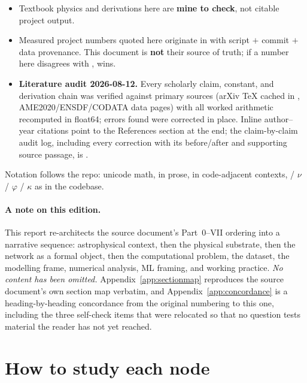 \begin{itemize}
\item Textbook physics and derivations here are \textbf{mine to check}, not
      citable project output.

\item Measured project numbers quoted here originate in  with
      script $+$ commit $+$ data provenance. This document is \textbf{not}
      their source of truth; if a number here disagrees with ,
       wins.

\item \textbf{Literature audit 2026-08-12.} Every scholarly claim, constant,
      and derivation chain was verified against primary sources (arXiv \TeX{}
      cached in , AME2020/ENSDF/CODATA data pages) with
      all worked arithmetic recomputed in float64; errors found were corrected
      in place. Inline author--year citations point to the References section
      at the end; the claim-by-claim audit log, including every correction with
      its before/after and supporting source passage, is
      .
\end{itemize}

Notation follows the repo: unicode math,  in prose,  in
code-adjacent contexts, \Ye{} / $\nu$ / $\varphi$ / $\kappa$ as in the
codebase.

\paragraph{A note on this edition.} This report re-architects the source
document's Part~0--VII ordering into a narrative sequence: astrophysical
context, then the physical substrate, then the network as a formal object,
then the computational problem, the dataset, the modelling frame, numerical
analysis, ML framing, and working practice. \emph{No content has been
omitted.} Appendix~\ref{app:sectionmap} reproduces the source document's own
section map verbatim, and Appendix~\ref{app:concordance} is a
heading-by-heading concordance from the original numbering to this one,
including the three self-check items that were relocated so that no question
tests material the reader has not yet reached.

\section*{How to study each node}
\label{sec:howtostudy}

